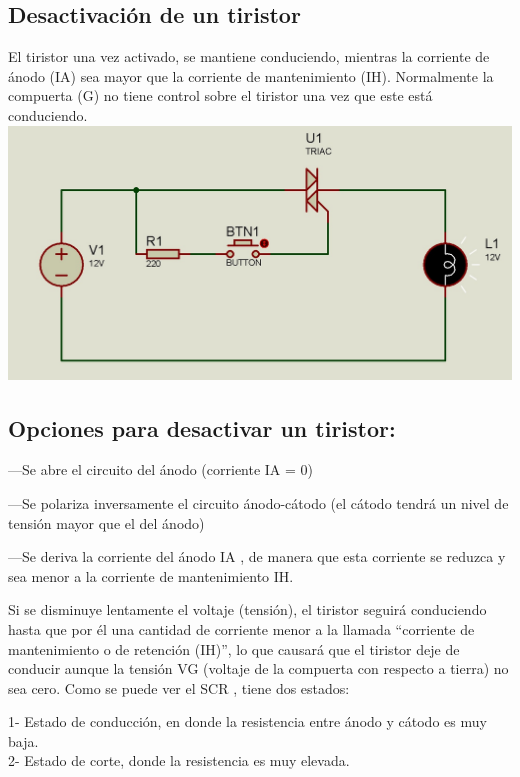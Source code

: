 \documentclass[12pt,a4paper]{article}
\begin{document}
\newpage
\begin{flushleft}
\subsection{Desactivación de un tiristor}
\end{flushleft}
\begin{flushleft}
El tiristor una vez activado, se mantiene conduciendo, mientras la corriente de ánodo (IA) sea mayor que la corriente de mantenimiento (IH). Normalmente la compuerta (G) no tiene control sobre el tiristor una vez que este está conduciendo.
\linebreak
\includegraphics[scale=0.4]{imagenes/tiristor2.JPG}
\end{flushleft}
\begin{center}
\subsection{Opciones para desactivar un tiristor:}
\end{center}
\begin{flushleft}
—Se abre el circuito del ánodo (corriente IA = 0)

—Se polariza inversamente el circuito ánodo-cátodo (el cátodo tendrá un nivel de tensión mayor que el del ánodo)

—Se deriva la corriente del ánodo IA , de manera que esta corriente se reduzca y sea menor a la corriente de mantenimiento IH.\linebreak

Si se disminuye lentamente el voltaje (tensión), el tiristor seguirá conduciendo hasta que por él una cantidad de corriente menor a la llamada “corriente de mantenimiento o de retención (IH)”, lo que causará que el tiristor deje de conducir aunque la tensión VG (voltaje de la compuerta con respecto a tierra) no sea cero. Como se puede ver el SCR , tiene dos estados:\linebreak

1- Estado de conducción, en donde la resistencia entre ánodo y cátodo es muy baja.\\
2- Estado de corte, donde la resistencia es muy elevada.\\
\end{flushleft}
\newpage
\end{document}
